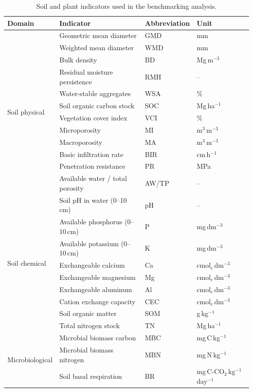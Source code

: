 \documentclass[pdflatex,sn-basic]{sn-jnl}%
\begin{document}
\begin{table}[ht]
\caption{Soil and plant indicators used in the benchmarking analysis.}\label{tab:indicators}
\begin{tabular*}{\textwidth}{@{\extracolsep\fill}llll}
\toprule
Domain & Indicator & Abbreviation & Unit \\
\midrule
\multirow{12}{*}{Soil physical}
  & Geometric mean diameter & GMD & mm \\
  & Weighted mean diameter & WMD & mm \\
  & Bulk density & BD & Mg\,m$^{-3}$ \\
  & Residual moisture persistence & RMH & -- \\
  & Water-stable aggregates & WSA & \% \\
  & Soil organic carbon stock & SOC & Mg\,ha$^{-1}$ \\
  & Vegetation cover index & VCI & \% \\
  & Microporosity & MI & m$^3$\,m$^{-3}$ \\
  & Macroporosity & MA & m$^3$\,m$^{-3}$ \\
  & Basic infiltration rate & BIR & cm\,h$^{-1}$ \\
  & Penetration resistance & PR & MPa \\
  & Available water / total porosity & AW/TP & -- \\
\midrule
\multirow{9}{*}{Soil chemical}
  & Soil pH in water (0--10\,cm) & pH & -- \\
  & Available phosphorus (0--10\,cm) & P & mg\,dm$^{-3}$ \\
  & Available potassium (0--10\,cm) & K & mg\,dm$^{-3}$ \\
  & Exchangeable calcium & Ca & cmol$_c$\,dm$^{-3}$ \\
  & Exchangeable magnesium & Mg & cmol$_c$\,dm$^{-3}$ \\
  & Exchangeable aluminum & Al & cmol$_c$\,dm$^{-3}$ \\
  & Cation exchange capacity & CEC & cmol$_c$\,dm$^{-3}$ \\
  & Soil organic matter & SOM & g\,kg$^{-1}$ \\
  & Total nitrogen stock & TN & Mg\,ha$^{-1}$ \\
\midrule
\multirow{5}{*}{Microbiological}
  & Microbial biomass carbon & MBC & mg\,C\,kg$^{-1}$ \\
  & Microbial biomass nitrogen & MBN & mg\,N\,kg$^{-1}$ \\
  & Soil basal respiration & BR & mg\,C-CO$_2$\,kg$^{-1}$\,day$^{-1}$ \\

\end{tabular*}
\end{table}
\end{document}

